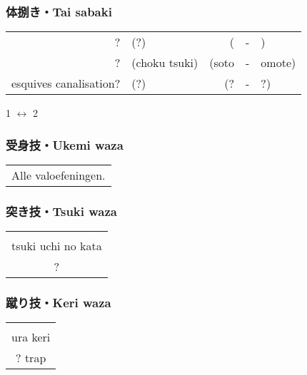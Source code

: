 \subsubsection{体捌き・Tai sabaki}
\begin{table}[H]
\begin{center}
\begin{tabular}{rlrcl}
    ? & (?) & (\ruby{}{} & - & \ruby{}{})\\
    ? & (choku tsuki) & (soto & - & omote)\\
    esquives canalisation? & (?) & (? & - & ?)
\end{tabular}
\end{center}
\label{kyuu_2_taisabaki}
\end{table}
\begin{center}
    1 $\leftrightarrow$ 2
\end{center}

\subsubsection{受身技・Ukemi waza}
\begin{table}[H]
\begin{center}
\begin{tabular}{c}
    Alle valoefeningen.
\end{tabular}
\end{center}
\label{kyuu_2_ukemi_waza}
\end{table}

\subsubsection{突き技・Tsuki waza}
\begin{table}[H]
\begin{center}
\begin{tabular}{c}
    \ruby{}{}\\
    tsuki uchi no kata\\
    ?
\end{tabular}
\end{center}
\label{kyuu_2_tsuki_waza}
\end{table}

\subsubsection{蹴り技・Keri waza}
\begin{table}[H]
\begin{center}
\begin{tabular}{c}
    \ruby{}{}\\
    ura keri\\
    ? trap
\end{tabular}
\end{center}
\label{kyuu_2_keri_waza}
\end{table}

